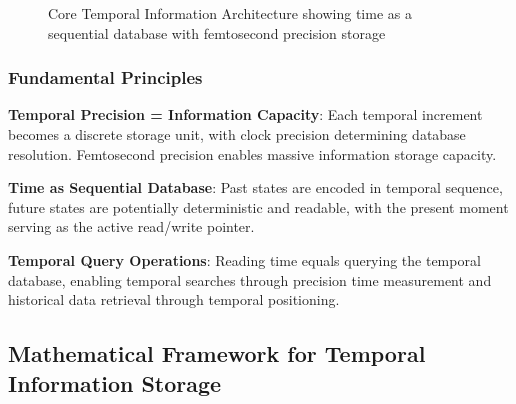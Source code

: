 \documentclass[12pt,a4paper]{article}
\begin{document}
{{{{{{{{{{{{{{\begin{figure}[H]
\caption{Core Temporal Information Architecture showing time as a sequential database with femtosecond precision storage}
\label{fig:temporal_information_architecture}
\end{figure}

\subsubsection{Fundamental Principles}

\textbf{Temporal Precision = Information Capacity}:
Each temporal increment becomes a discrete storage unit, with clock precision determining database resolution. Femtosecond precision enables massive information storage capacity.

\textbf{Time as Sequential Database}:
Past states are encoded in temporal sequence, future states are potentially deterministic and readable, with the present moment serving as the active read/write pointer.

\textbf{Temporal Query Operations}:
Reading time equals querying the temporal database, enabling temporal searches through precision time measurement and historical data retrieval through temporal positioning.

\subsection{Mathematical Framework for Temporal Information Storage}

}}}}}}}}}}}}}}
\end{document}
